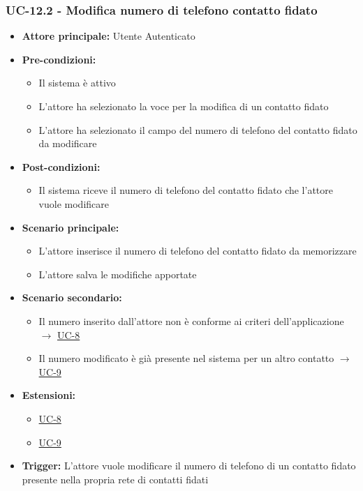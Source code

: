 \documentclass[a4paper,12pt]{article}
\begin{document}
\subsubsection{UC-12.2 - Modifica numero di telefono contatto fidato} \label{subsec:UC-12.2}
\begin{itemize}
    \item \textbf{Attore principale:} Utente Autenticato
    \item \textbf{Pre-condizioni:}
    \begin{itemize}
        \item Il sistema è attivo
        \item L'attore ha selezionato la voce per la modifica di un contatto fidato
        \item L'attore ha selezionato il campo del numero di telefono del contatto fidato da modificare
    \end{itemize}
    \item \textbf{Post-condizioni:} 
    \begin{itemize}
        \item Il sistema riceve il numero di telefono del contatto fidato che l'attore vuole modificare
    \end{itemize}
    \item \textbf{Scenario principale:} 
    \begin{itemize}
        \item L'attore inserisce il numero di telefono del contatto fidato da memorizzare
        \item L'attore salva le modifiche apportate
    \end{itemize}
    \item \textbf{Scenario secondario:}
    \begin{itemize}
        \item Il numero inserito dall'attore non è conforme ai criteri dell'applicazione $\rightarrow$ \hyperref[subsec:UC-8]{UC-8}
        \item Il numero modificato è già presente nel sistema per un altro contatto $\rightarrow$ \hyperref[subsec:UC-9]{UC-9}
    \end{itemize}
    \item \textbf{Estensioni:}
    \begin{itemize}
        \item \hyperref[subsec:UC-8]{UC-8}
        \item \hyperref[subsec:UC-9]{UC-9}
    \end{itemize}
    \item \textbf{Trigger:} L'attore vuole modificare il numero di telefono di un contatto fidato presente nella propria rete di contatti fidati
\end{itemize}
\end{document}
